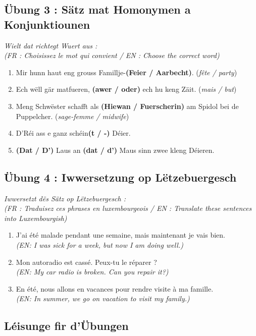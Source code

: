 \subsection*{Übung 3 : Sätz mat Homonymen a Konjunktiounen}
\textit{Wielt dat richtegt Wuert aus :} \\
\textit{\small(FR : Choisissez le mot qui convient / EN : Choose the correct word)}
\begin{enumerate}
    \item Mir hunn haut eng grouss Famillje-\textbf{(Feier / Aarbecht)}. (\textit{fête / party})
    \item Ech wëll gär matfueren, \textbf{(awer / oder)} ech hu keng Zäit. (\textit{mais / but})
    \item Meng Schwëster schafft als \textbf{(Hiewan / Fuerscherin)} am Spidol bei de Puppelcher. (\textit{sage-femme / midwife})
    \item D'Réi ass e ganz schéin\textbf{(t / -)} Déier.
    \item \textbf{(Dat / D')} Laus an \textbf{(dat / d')} Maus sinn zwee kleng Déieren.
\end{enumerate}

\subsection*{Übung 4 : Iwwersetzung op Lëtzebuergesch}
\textit{Iwwersetzt dës Sätz op Lëtzebuergesch :} \\
\textit{\small(FR : Traduisez ces phrases en luxembourgeois / EN : Translate these sentences into Luxembourgish)}
\begin{enumerate}
    \item J'ai été malade pendant une semaine, mais maintenant je vais bien. \\
    \small\textit{(EN: I was sick for a week, but now I am doing well.)}
    \item Mon autoradio est cassé. Peux-tu le réparer ? \\
    \small\textit{(EN: My car radio is broken. Can you repair it?)}
    \item En été, nous allons en vacances pour rendre visite à ma famille. \\
    \small\textit{(EN: In summer, we go on vacation to visit my family.)}
\end{enumerate}

\vspace{1em}

\subsection*{Léisunge fir d'Übungen}

